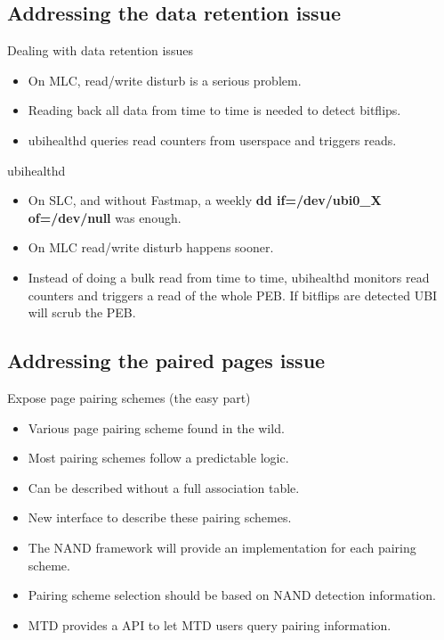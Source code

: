 \documentclass[aspectratio=169,obeyspaces,spaces,hyphens,dvipsnames]{beamer}
\begin{document}
\subsection{Addressing the data retention issue}

\begin{frame}{Dealing with data retention issues}
  \begin{itemize}
  \item On MLC, read/write disturb is a serious problem.
  \item Reading back all data from time to time is needed to detect bitflips.
  \item ubihealthd queries read counters from userspace and triggers reads.
  \end{itemize}
\end{frame}

\begin{frame}{ubihealthd}
  \begin{itemize}
  \item On SLC, and without Fastmap, a weekly \textbf{dd if=/dev/ubi0\_X of=/dev/null} was enough.
  \item On MLC read/write disturb happens sooner.
  \item Instead of doing a bulk read from time to time, ubihealthd monitors read counters and triggers
        a read of the whole PEB. If bitflips are detected UBI will scrub the PEB.
  \end{itemize}
\end{frame}

\subsection{Addressing the paired pages issue}

\begin{frame}{Expose page pairing schemes (the easy part)}
  \begin{itemize}
  \item Various page pairing scheme found in the wild.
  \item Most pairing schemes follow a predictable logic.
  \item Can be described without a full association table.
  \item New interface to describe these pairing schemes.
  \item The NAND framework will provide an implementation for each pairing scheme.
  \item Pairing scheme selection should be based on NAND detection information.
  \item MTD provides a API to let MTD users query pairing information.
  \end{itemize}
\end{frame}
\end{document}
